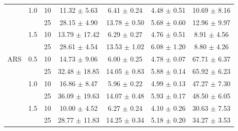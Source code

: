 \documentclass[manuscript,screen,review]{acmart}
\begin{document}
\begin{table}[ht]
{\begin{tabular}{ccccccc}
    & 1.0 & 10 &  11.32 $\pm$    5.63 &    6.41 $\pm$   0.24 &           4.48 $\pm$   0.51 &    10.69 $\pm$    8.16 \\
    &     & 25 &  28.15 $\pm$    4.90 &   13.78 $\pm$   0.50 &           5.68 $\pm$   0.60 &    12.96 $\pm$    9.97 \\
    & 1.5 & 10 &  13.79 $\pm$   17.42 &    6.29 $\pm$   0.27 &           4.76 $\pm$   0.51 &     8.91 $\pm$    4.56 \\
    &     & 25 &  28.61 $\pm$    4.54 &   13.53 $\pm$   1.02 &           6.08 $\pm$   1.20 &     8.80 $\pm$    4.26 \\
ARS & 0.5 & 10 &  14.73 $\pm$    9.06 &    6.00 $\pm$  0.25 &           4.78 $\pm$   0.07 &    67.71 $\pm$    6.37 \\
    &     & 25 &  32.48 $\pm$   18.85 &   14.05 $\pm$   0.83 &           5.88 $\pm$   0.14 &    65.92 $\pm$   6.23 \\
    & 1.0 & 10 &  16.86 $\pm$    8.47 &    5.96 $\pm$   0.22 &           4.99 $\pm$   0.13 &    47.27 $\pm$    7.30 \\
    &     & 25 &  36.09 $\pm$   19.63 &   14.07 $\pm$   0.48 &           5.93 $\pm$   0.17 &    48.50 $\pm$    6.05 \\
    & 1.5 & 10 &  10.00 $\pm$    4.52 &    6.27 $\pm$   0.24 &           4.10 $\pm$   0.26 &    30.63 $\pm$    7.53 \\
    &     & 25 &  28.77 $\pm$   11.83 &   14.25 $\pm$   0.34 &           5.18 $\pm$   0.20 &    34.27 $\pm$    3.53 \\

\end{tabular}}
\label{tab:additional}
\end{table}%
\end{document}
